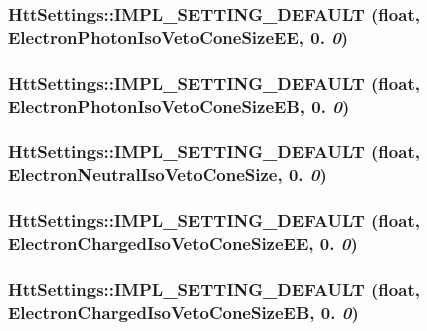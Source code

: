 \hypertarget{classHttSettings_aa2601b20bc336ea96cdba63e4ecb5efb}{
\subsubsection[{IMPL\_\-SETTING\_\-DEFAULT}]{\setlength{\rightskip}{0pt plus 5cm}HttSettings::IMPL\_\-SETTING\_\-DEFAULT (float, \/  ElectronPhotonIsoVetoConeSizeEE, \/  0. {\em 0})}}
\label{classHttSettings_aa2601b20bc336ea96cdba63e4ecb5efb}
\hypertarget{classHttSettings_a0bb6fa869d920c9d97e0a0a5978d4e08}{
\subsubsection[{IMPL\_\-SETTING\_\-DEFAULT}]{\setlength{\rightskip}{0pt plus 5cm}HttSettings::IMPL\_\-SETTING\_\-DEFAULT (float, \/  ElectronPhotonIsoVetoConeSizeEB, \/  0. {\em 0})}}
\label{classHttSettings_a0bb6fa869d920c9d97e0a0a5978d4e08}
\hypertarget{classHttSettings_a0f6830aa0568d5000b5ee7b7fc066e58}{
\subsubsection[{IMPL\_\-SETTING\_\-DEFAULT}]{\setlength{\rightskip}{0pt plus 5cm}HttSettings::IMPL\_\-SETTING\_\-DEFAULT (float, \/  ElectronNeutralIsoVetoConeSize, \/  0. {\em 0})}}
\label{classHttSettings_a0f6830aa0568d5000b5ee7b7fc066e58}
\hypertarget{classHttSettings_a6072701632fb21cf187072f41fa1c88b}{
\subsubsection[{IMPL\_\-SETTING\_\-DEFAULT}]{\setlength{\rightskip}{0pt plus 5cm}HttSettings::IMPL\_\-SETTING\_\-DEFAULT (float, \/  ElectronChargedIsoVetoConeSizeEE, \/  0. {\em 0})}}
\label{classHttSettings_a6072701632fb21cf187072f41fa1c88b}
\hypertarget{classHttSettings_a4320a54adcb8df7075bc219c9c21a098}{
\subsubsection[{IMPL\_\-SETTING\_\-DEFAULT}]{\setlength{\rightskip}{0pt plus 5cm}HttSettings::IMPL\_\-SETTING\_\-DEFAULT (float, \/  ElectronChargedIsoVetoConeSizeEB, \/  0. {\em 0})}}
